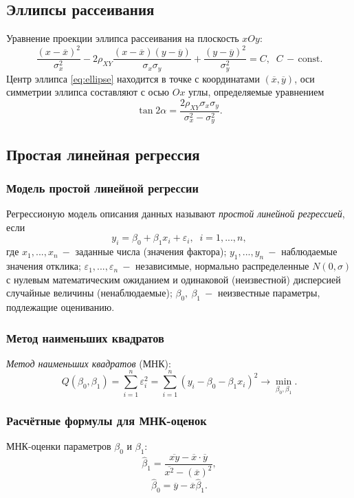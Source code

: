\documentclass[a4paper,12pt]{article} %
\begin{document}
\subsection{Эллипсы рассеивания}
Уравнение проекции эллипса рассеивания на плоскость $xOy$:
\begin{equation}\label{eq:ellipse}
    \frac{\left(x-\overline{x}\right)^2}{\sigma_x^2}-2\rho_{XY}^{}\frac{(x-\overline{x})(y-\overline{y})}{\sigma_x\sigma_y}+\frac{\left(y-\overline{y}\right)^2}{\sigma_y^2}=C,\;\;C\,-\,\text{const}.
\end{equation}
Центр эллипса \eqref{eq:ellipse} находится в точке с координатами $(\overline{x},\overline{y})$, оси симметрии эллипса составляют с осью $Ox$ углы, определяемые уравнением
\begin{equation}
    \tan{2\alpha}=\frac{2\rho_{XY}^{}\sigma_x\sigma_y}{\sigma_x^2-\sigma_y^2}.
\end{equation}
\subsection{Простая линейная регрессия}
\subsubsection{Модель простой линейной регрессии}
Регрессионую модель описания данных называют \textit{простой линейной регрессией}, если
\begin{equation}
    y_i=\beta_0 + \beta_1 x_i + \varepsilon_i,\;\;i=1,...,n,
\end{equation}
где $x_1, ..., x_n\:-$ заданные числа (значения фактора); $y_1,...,y_n\:-$ наблюдаемые значения отклика; $\varepsilon_1,...,\varepsilon_n\:-$ независимые, нормально распределенные $N(0,\sigma)$ с нулевым математическим ожиданием и одинаковой (неизвестной) дисперсией случайные величины (ненаблюдаемые); $\beta_0,\:\beta_1\:-$ неизвестные параметры, подлежащие оцениванию.
\subsubsection{Метод наименьших квадратов}
\textit{Метод наименьших квадратов} (МНК):
\begin{equation}
    Q\left(\beta_0,\beta_1\right)=\sum_{i=1}^n \varepsilon_i^2= \sum_{i=1}^n\left(y_i-\beta_0-\beta_1 x_i\right)^2\to\min_{\beta_0,\beta_1}.
\end{equation}
\subsubsection{Расчётные формулы для МНК-оценок}
МНК-оценки параметров $\beta_0$ и $\beta_1$:
\begin{equation}
    \widehat{\beta}_1=\frac{\overline{xy}-\overline{x}\cdot\overline{y}}{\overline{x^2}-(\overline{x})^2},
\end{equation}
\begin{equation}
    \widehat{\beta}_0=\overline{y}-\overline{x}\widehat{\beta}_1.
\end{equation}
\end{document}

